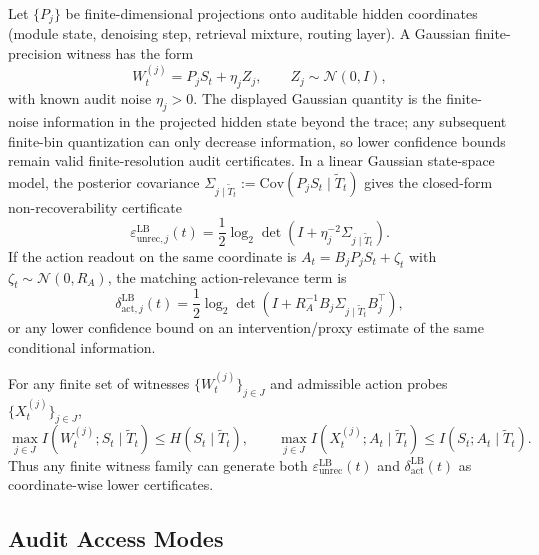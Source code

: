   Let $\{P_j\}$ be finite-dimensional projections onto auditable hidden coordinates
  (module state, denoising step, retrieval mixture, routing layer). A Gaussian
  finite-precision witness has the form
  \[
    W_t^{(j)} = P_j S_t + \eta_j Z_j,
    \qquad Z_j\sim\mathcal N(0,I),
  \]
  with known audit noise $\eta_j>0$. The displayed Gaussian quantity is the
  finite-noise information in the projected hidden state beyond the trace; any
  subsequent finite-bin quantization can only decrease information, so lower
  confidence bounds remain valid finite-resolution audit certificates. In a
  linear Gaussian state-space model, the posterior covariance
  $\Sigma_{j\mid\tilde T_t}:=\mathrm{Cov}(P_jS_t\mid\tilde T_t)$ gives the
  closed-form non-recoverability certificate
  \[
    \varepsilon_{\mathrm{unrec},j}^{\mathrm{LB}}(t)
    =
    \frac12\log_2\det\!\left(I+\eta_j^{-2}\Sigma_{j\mid\tilde T_t}\right).
  \]
  If the action readout on the same coordinate is
  $A_t=B_jP_jS_t+\zeta_t$ with $\zeta_t\sim\mathcal N(0,R_A)$, the matching
  action-relevance term is
  \[
    \delta_{\mathrm{act},j}^{\mathrm{LB}}(t)
    =
    \frac12\log_2\det\!\left(
      I+R_A^{-1}B_j\Sigma_{j\mid\tilde T_t}B_j^\top
    \right),
  \]
  or any lower confidence bound on an intervention/proxy estimate of the same
  conditional information.

  \begin{proposition}
  \label{prop:engine}
  For any finite set of witnesses $\{W_t^{(j)}\}_{j\in J}$ and
  admissible action probes $\{X_t^{(j)}\}_{j\in J}$,
  \[
    \max_{j\in J} I(W_t^{(j)};S_t\mid\tilde T_t)
    \leq
    H(S_t\mid\tilde T_t),
    \qquad
    \max_{j\in J} I(X_t^{(j)};A_t\mid\tilde T_t)
    \leq
    I(S_t;A_t\mid\tilde T_t).
  \]
  Thus any finite witness family can generate both
  $\varepsilon_\mathrm{unrec}^\mathrm{LB}(t)$ and
  $\delta_\mathrm{act}^\mathrm{LB}(t)$ as coordinate-wise lower certificates.
  \end{proposition}

  \subsection{Audit Access Modes}


